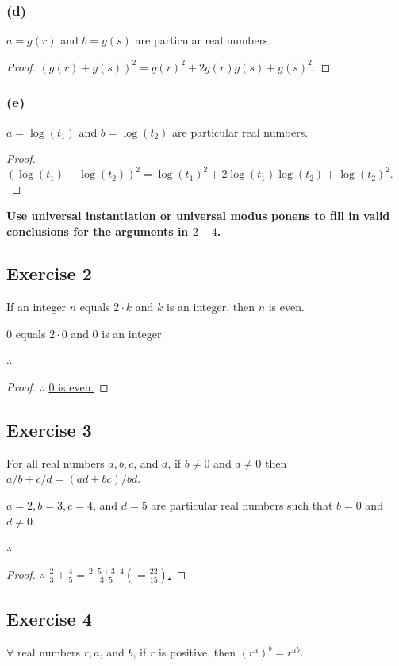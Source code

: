 \documentclass[14pt]{extarticle}
\newcommand{\dps}{\displaystyle}
\newcommand{\fbl}{\underline{\hspace{1cm}}\,\,}
\newcommand{\fa}{\forall}
\begin{document}
\subsubsection{(d)}
$a = g(r)$ and $b = g(s)$ are particular real numbers.

\begin{proof}
    $(g(r) + g(s))^2 = g(r)^2 + 2g(r)g(s) + g(s)^2. $
\end{proof}

\subsubsection{(e)}
$a = \log(t_1)$ and $b = \log(t_2)$ are particular real numbers.

\begin{proof}
    $(\log(t_1) + \log(t_2))^2 = \log(t_1)^2 + 2\log(t_1)\log(t_2) + \log(t_2)^2. $
\end{proof}

{\bf \color{cyan} Use universal instantiation or universal modus ponens to fill in valid conclusions for the arguments in $2-4$.}

\subsection{Exercise 2}
If an integer $n$ equals $2\cdot k$ and $k$ is an integer, then $n$ is even.

0 equals $2\cdot 0$ and 0 is an integer.

$\therefore$ \fbl

\begin{proof}
    $\therefore$ \underline{0 is even.}
\end{proof}

\subsection{Exercise 3}
For all real numbers $a, b, c$, and $d$, if $b \neq 0$ and $d \neq 0$ then $a/b + c/d = (ad + bc)/bd$.

$a = 2, b = 3, c = 4$, and $d = 5$ are particular real numbers such that $b = 0$ and $d \neq 0$.

$\therefore$ \fbl

\begin{proof}
    $\therefore$ \underline{$\dps \frac{2}{3} + \frac{4}{5} = \frac{2\cdot5 + 3\cdot4}{3\cdot5} \left( = \frac{22}{15}\right)$.}
\end{proof}

\subsection{Exercise 4}
$\fa$ real numbers $r, a$, and $b$, if $r$ is positive, then $(r^a)^b = r^{ab}$.
\end{document}
